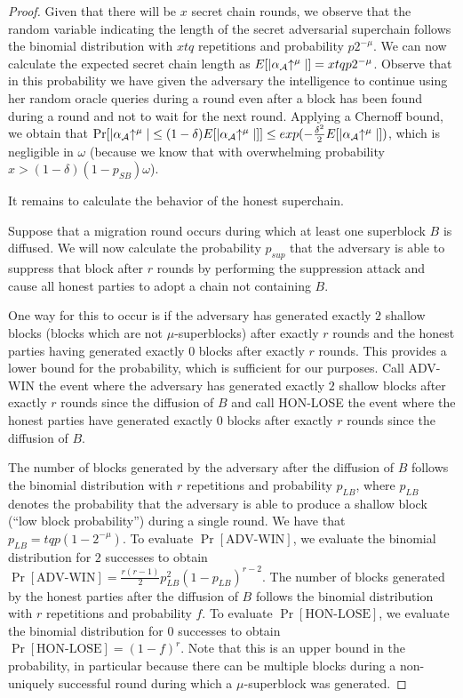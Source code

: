 \begin{proof}
Given that there will be $x$ secret chain rounds, we observe that the random
variable indicating the length of the secret adversarial superchain follows the
binomial distribution with $xtq$ repetitions and probability $p2^{-\mu}$. We
can now calculate the expected secret chain length as
$E[|\alpha_\mathcal{A}\negthickspace\uparrow^\mu|] = xtqp2^{-\mu}$. Observe that in this
probability we have given the adversary the intelligence to continue using her
random oracle queries during a round even after a block has been found during a
round and not to wait for the next round. Applying a Chernoff bound, we obtain
that $\Pr[|\alpha_\mathcal{A}\negthickspace\uparrow^\mu| \leq (1 -
\delta)E[|\alpha_\mathcal{A}\negthickspace\uparrow^\mu|]] \leq
exp(-\frac{\delta^2}{2}E[|\alpha_\mathcal{A}\negthickspace\uparrow^\mu|])$, which is
negligible in $\omega$ (because we know that with overwhelming probability $x >
(1 - \delta)(1 - p_{SB})\omega$).

It remains to calculate the behavior of the honest superchain.

Suppose that a migration round occurs during which at least one superblock $B$
is diffused. We will now calculate the probability $p_{sup}$ that the adversary
is able to suppress that block after $r$ rounds by performing the suppression
attack and cause all honest parties to adopt a chain not containing $B$.

One way for this to occur is if the adversary has generated exactly $2$ shallow
blocks (blocks which are not $\mu$-superblocks) after exactly $r$ rounds and the
honest parties having generated exactly $0$ blocks after exactly $r$ rounds.
This provides a lower bound for the probability, which is sufficient for our
purposes. Call ADV-WIN the event where the adversary has generated exactly $2$
shallow blocks after exactly $r$ rounds since the diffusion of $B$ and call
HON-LOSE the event where the honest parties have generated exactly $0$ blocks
after exactly $r$ rounds since the diffusion of $B$.

The number of blocks generated by the adversary after the diffusion of $B$
follows the binomial distribution with $r$ repetitions and probability $p_{LB}$,
where $p_{LB}$ denotes the probability that the adversary is able to produce a
shallow block (``low block probability'') during a single round. We have that
$p_{LB} = tqp(1 - 2^{-\mu})$. To evaluate $\Pr[\text{ADV-WIN}]$, we evaluate the
binomial distribution for $2$ successes to obtain $\Pr[\text{ADV-WIN}] =
\frac{r(r - 1)}{2} p_{LB}^2 (1 - p_{LB})^{r - 2}$. The number of blocks
generated by the honest parties after the diffusion of $B$ follows the binomial
distribution with $r$ repetitions and probability $f$. To evaluate
$\Pr[\text{HON-LOSE}]$, we evaluate the binomial distribution for $0$ successes
to obtain $\Pr[\text{HON-LOSE}] = (1 - f)^r$. Note that this is an upper bound
in the probability, in particular because there can be multiple
blocks during a non-uniquely successful round during which a $\mu$-superblock
was generated.


\end{proof}
